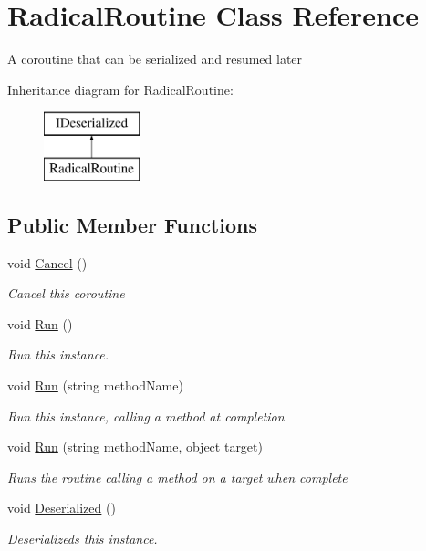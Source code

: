 \hypertarget{class_radical_routine}{}\section{Radical\+Routine Class Reference}
\label{class_radical_routine}


A coroutine that can be serialized and resumed later  


Inheritance diagram for Radical\+Routine\+:\begin{figure}[H]
\begin{center}
\leavevmode
\includegraphics[height=2.000000cm]{class_radical_routine}
\end{center}
\end{figure}
\subsection*{Public Member Functions}
\begin{DoxyCompactItemize}
\item 
void \hyperlink{class_radical_routine_ae628b04cef3d0780dcbef12be3d910a0}{Cancel} ()
\begin{DoxyCompactList}\small\item\em Cancel this coroutine \end{DoxyCompactList}\item 
void \hyperlink{class_radical_routine_a9449de246564f0d82a2890db45cbad94}{Run} ()
\begin{DoxyCompactList}\small\item\em Run this instance. \end{DoxyCompactList}\item 
void \hyperlink{class_radical_routine_a2e4e2003e922bb66ff5352b1fa33a6fa}{Run} (string method\+Name)
\begin{DoxyCompactList}\small\item\em Run this instance, calling a method at completion \end{DoxyCompactList}\item 
void \hyperlink{class_radical_routine_ab638af87a31b27630da41523771ea764}{Run} (string method\+Name, object target)
\begin{DoxyCompactList}\small\item\em Runs the routine calling a method on a target when complete \end{DoxyCompactList}\item 
void \hyperlink{class_radical_routine_a4e2d17f21fc9df7ef8bb06ba3a22e9e0}{Deserialized} ()
\begin{DoxyCompactList}\small\item\em Deserializeds this instance. \end{DoxyCompactList}\end{DoxyCompactItemize}
